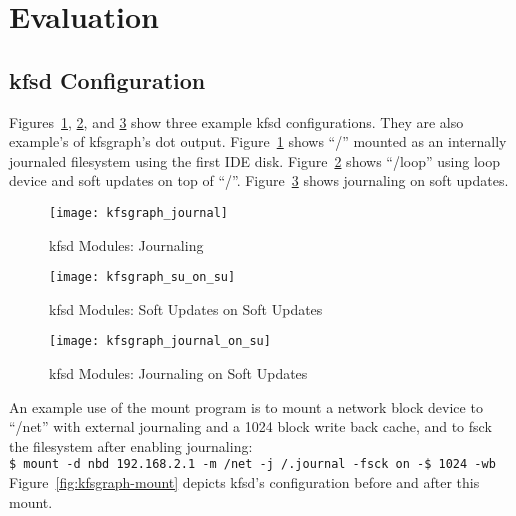 \section{Evaluation}
\label{sec:eval}

\subsection{kfsd Configuration}
\label{sec:eval:configuration}

\newcommand{\kfsgraphscale}{0.5}

Figures~\ref{fig:kfsgraph-journal}, \ref{fig:kfsgraph-su-on-su}, and
\ref{fig:kfsgraph-journal-on-su} show three example kfsd configurations. They
are also example's of kfsgraph's dot output. Figure~\ref{fig:kfsgraph-journal}
shows ``/'' mounted as an internally journaled filesystem using the first IDE
disk. Figure~\ref{fig:kfsgraph-su-on-su} shows ``/loop'' using loop device and
soft updates on top of ``/''. Figure~\ref{fig:kfsgraph-journal-on-su} shows
journaling on soft updates.

\begin{figure}[htb]
\begin{center}
  \texttt{[image: kfsgraph\_journal]}
  \caption{kfsd Modules: Journaling}
  \label{fig:kfsgraph-journal}
\end{center}
\end{figure}

\begin{figure}[htb]
\begin{center}
  \texttt{[image: kfsgraph\_su\_on\_su]}
  \caption{kfsd Modules: Soft Updates on Soft Updates}
  \label{fig:kfsgraph-su-on-su}
\end{center}
\end{figure}

\begin{figure}[htb]
\begin{center}
  \texttt{[image: kfsgraph\_journal\_on\_su]}
  \caption{kfsd Modules: Journaling on Soft Updates}
  \label{fig:kfsgraph-journal-on-su}
\end{center}
\end{figure}

An example use of the mount program is to mount a network block device to
``/net'' with external journaling and a 1024 block write back cache, and to
fsck the filesystem after enabling journaling:\\
\indent \texttt{\$ mount -d nbd 192.168.2.1 -m /net -j /.journal -fsck on -\$ 1024 -wb}\\
Figure~\ref{fig:kfsgraph-mount} depicts kfsd's configuration before and after
this mount.

